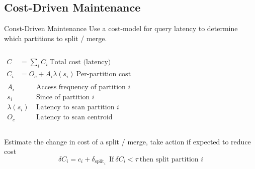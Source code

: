 \subsection{Cost-Driven Maintenance}

\begin{frame}{Const-Driven Maintenance}
Use a cost-model for query latency to determine which partitions to split / merge.
\begin{columns}
\begin{align*}
  C &= \sum_{i}C_i \ \text{Total cost (latency)}\\
  C_i &= O_c + A_i \lambda(s_i) \ \text{Per-partition cost}\\
\end{align*}
\begin{align*}
  A_i & \ \text{Access frequency of partition }i \\
  s_i & \ \text{Since of partition }i \\
  \lambda(s_i) & \ \text{Latency to scan partition } i \\
O_c & \ \text{Latency to scan centroid}
\end{align*}
\end{columns}
Estimate the change in cost of a split / merge, take action if expected to reduce cost
$$
\delta C_i = c_i + \delta_{\text{split}_i} \ \ \text{If} \ \delta C_i < \tau \ \text{then split partition } i
$$
\end{frame}
